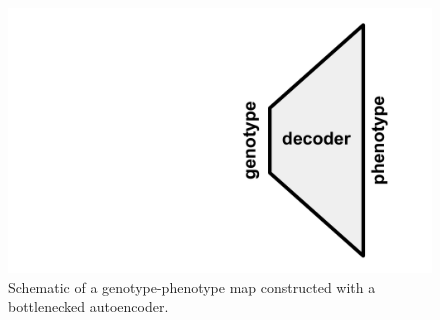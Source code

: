 \begin{figure}
  \includegraphics[width=\linewidth]{img/bottleneck_map}
  \caption{Schematic of a genotype-phenotype map constructed with a bottlenecked autoencoder.}
  \label{fig:bottleneck_map}
\end{figure}
